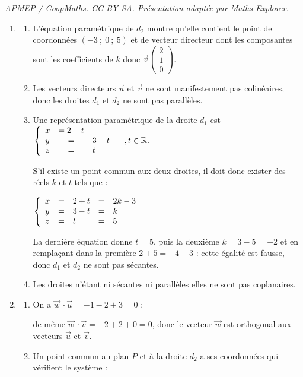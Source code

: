 \documentclass[10pt]{article}
\providecommand{\R}{\mathbb{R}}
\providecommand{\vect}[1]{\overrightarrow{#1}}
\begin{document}
\noindent\textit{APMEP / CoopMaths. CC BY-SA. Présentation adaptée par Maths Explorer.}\par\medskip
\medskip

\begin{enumerate}
\item 
	\begin{enumerate}
		\item L'équation paramétrique de $d_2$ montre qu'elle contient le point de coordonnées $(-3~;~0~;~5)$ et de vecteur directeur dont les composantes sont les coefficients de $k$ donc $\vect{v}\begin{pmatrix}2\\1\\0\end{pmatrix}$.
		\item Les vecteurs directeurs $\vect{u}$ et $\vect{v}$ ne sont manifestement pas colinéaires, donc les droites $d_1$ et $d_2$ ne sont pas parallèles.
		\item Une représentation paramétrique de la droite $d_1$ est $\left\{\begin{array}{l c l}
x&=2 + t\\
y&=&3 - t\\
z&=&t
\end{array}\right. \quad , t \in \R$.

S'il existe un point commun aux deux droites, il doit donc exister des réels $k$ et $t$ tels que :

$\left\{\begin{array}{l c l c l}
x &=& 2 + t&=&2k - 3\\
y&=&3 - t&=&k\\
z&=&t&=&5
\end{array}\right.$

La dernière équation donne $t = 5$, puis la deuxième $k = 3 - 5 = - 2$ et en remplaçant dans la première $2 + 5 = - 4 - 3$ : cette égalité est fausse, donc $d_1$ et $d_2$  ne sont pas sécantes.
		\item Les droites n'étant ni sécantes ni parallèles elles ne sont pas coplanaires.
	\end{enumerate}
\item 
	\begin{enumerate}
		\item On a $\vect{w}\ \cdot \vect{u} = - 1 - 2 + 3 = 0$ ;
		
		de même $\vect{w}\ \cdot \vect{v} = - 2 + 2 + 0 = 0$, donc le vecteur $\vect{w}$ est orthogonal aux vecteurs $\vect{u}$ et $\vect{v}$.
		\item Un point commun au plan $P$ et à la droite $d_2$ a ses coordonnées qui vérifient le système :
		

\end{enumerate}
\end{enumerate}
\end{document}
